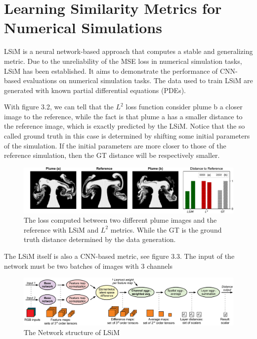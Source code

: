 \documentclass[a4paper,12pt,twoside]{report}
\begin{document}
\section{Learning Similarity Metrics for Numerical Simulations}

LSiM \cite{kohl2020learning} is a neural network-based approach that computes a stable and generalizing metric. Due to the unreliability of the MSE loss in numerical simulation tasks, LSiM has been established. It aims to demonstrate the performance of CNN-based evaluations on numerical simulation tasks. The data used to train LSiM are generated with known partial differential equations (PDEs). 

With figure 3.2, we can tell that the $L^2$ loss function consider plume b a closer image to the reference, while the fact is that plume a has a smaller distance to the reference image, which is exactly predicted by the LSiM. Notice that the so called ground truth in this case is determined by shifting some initial parameters of the simulation. If the initial parameters are more closer to those of the reference simulation, then the GT distance will be respectively smaller.

\begin{figure}
\centering
\includegraphics[width=1.0\textwidth]{Plumes.pdf}
\caption{The loss computed between two different plume images and the reference with LSiM and $L^2$ metrics. While the GT is the ground truth distance determined by the data generation.  }
\end{figure}
The LSiM itself is also a CNN-based metric, see figure 3.3. The input of the network must be two batches of images with 3 channels
\begin{figure}
\centering
\includegraphics[width=1.0\textwidth]{DistanceComputation.pdf}
\caption{The Network structure of LSiM}
\end{figure}
\end{document}
